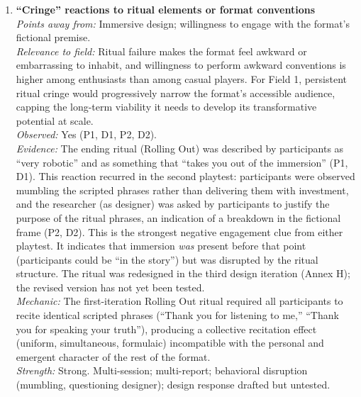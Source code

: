 \documentclass[12pt]{article}
\begin{document}
\begin{enumerate}
\item \textbf{``Cringe'' reactions to ritual elements or format conventions}\\
\textit{Points away from:} Immersive design; willingness to engage with the format's fictional premise.\\
\textit{Relevance to field:} Ritual failure makes the format feel awkward or embarrassing to inhabit, and willingness to perform awkward conventions is higher among enthusiasts than among casual players. For Field 1, persistent ritual cringe would progressively narrow the format's accessible audience, capping the long-term viability it needs to develop its transformative potential at scale.\\
\textit{Observed:} Yes (P1, D1, P2, D2).\\
\textit{Evidence:} The ending ritual (Rolling Out) was described by participants as ``very robotic'' and as something that ``takes you out of the immersion'' (P1, D1). This reaction recurred in the second playtest: participants were observed mumbling the scripted phrases rather than delivering them with investment, and the researcher (as designer) was asked by participants to justify the purpose of the ritual phrases, an indication of a breakdown in the fictional frame (P2, D2). This is the strongest negative engagement clue from either playtest. It indicates that immersion \textit{was} present before that point (participants could be ``in the story'') but was disrupted by the ritual structure. The ritual was redesigned in the third design iteration (Annex H); the revised version has not yet been tested.\\
\textit{Mechanic:} The first-iteration Rolling Out ritual required all participants to recite identical scripted phrases (``Thank you for listening to me,'' ``Thank you for speaking your truth''), producing a collective recitation effect (uniform, simultaneous, formulaic) incompatible with the personal and emergent character of the rest of the format.\\
\textit{Strength:} Strong. Multi-session; multi-report; behavioral disruption (mumbling, questioning designer); design response drafted but untested.

\end{enumerate}

\bigskip

\end{document}
